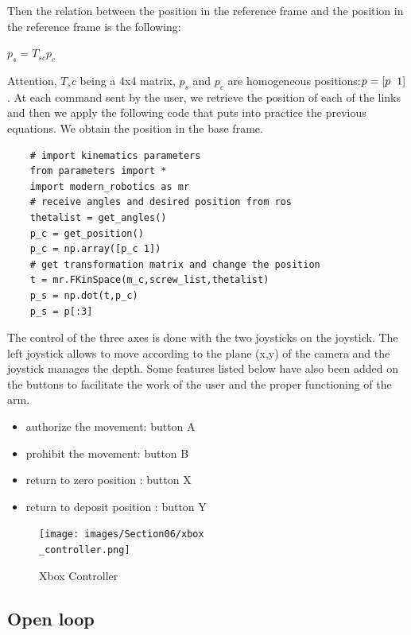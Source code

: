 \bigbreak
Then the relation between the position in the reference frame and the position in the reference frame is the following:
\begin{center}
    $p_s = T_{sc}p_c$
\end{center}

\bigbreak
Attention, $T_sc$ being a 4x4 matrix, $p_s$ and $p_c$ are homogeneous positions:$p = [p\hspace{0.2cm}1]$. At each command sent by the user, we retrieve the position of each of the links and then we apply the following code that puts into practice the previous equations. We obtain the position in the base frame.

\bigbreak
\begin{verbatim}
    # import kinematics parameters
    from parameters import * 
    import modern_robotics as mr
    # receive angles and desired position from ros 
    thetalist = get_angles()
    p_c = get_position()
    p_c = np.array([p_c 1])
    # get transformation matrix and change the position
    t = mr.FKinSpace(m_c,screw_list,thetalist)
    p_s = np.dot(t,p_c)
    p_s = p[:3]
\end{verbatim}

\bigbreak
The control of the three axes is done with the two joysticks on the joystick. The left joystick allows to move according to the plane (x,y) of the camera and the joystick manages the depth. Some features listed below have also been added on the buttons to facilitate the work of the user and the proper functioning of the arm.
\begin{itemize}[noitemsep]
    \item authorize the movement: button A
    \item prohibit the movement: button B
    \item return to zero position : button X
    \item return to deposit position : button Y
\end{itemize}

\begin{figure}[ht]
    \centering
    \texttt{[image: images/Section06/xbox\\\_controller.png]}
    \caption{Xbox Controller}
    \label{fig:mesh18}
\end{figure}
\FloatBarrier

\subsection{Open loop}

